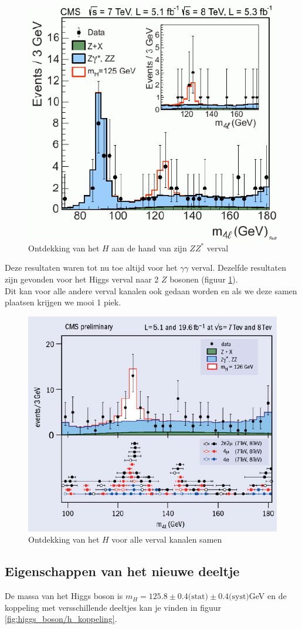 \documentclass[../main.tex]{subfiles}
\begin{document}
\begin{figure}[h]
    \centering
    \includegraphics[width=0.5\linewidth]{higgs_boson/sigma_h_z_verval.png}
    \caption{Ontdekking van het $H$ aan de hand van zijn $ZZ^*$ verval}%
    \label{fig:higgs_boson/sigma_h_z_verval}
\end{figure}

Deze resultaten waren tot nu toe altijd voor het $\gamma\gamma$ verval. Dezelfde resultaten zijn gevonden voor het Higgs verval naar 2 $Z$ bosonen (figuur \ref{fig:higgs_boson/sigma_h_z_verval}).\\
Dit kan voor alle andere verval kanalen ook gedaan worden en als we deze samen plaatsen krijgen we mooi 1 piek.

\begin{figure}[h]
    \centering
    \includegraphics[width=0.5\linewidth]{higgs_boson/sigma_h_alles.png}
    \caption{Ontdekking van het $H$ voor alle verval kanalen samen}%
    \label{fig:higgs_boson/sigma_h_alles}
\end{figure}

\subsection{Eigenschappen van het nieuwe deeltje}%
\label{sub:eigenschappen_van_het_nieuwe_deeltje}

De massa van het Higgs boson is $m_H=125.8\pm0.4\text{(stat)}\pm 0.4\text{(syst)}$GeV en de koppeling met versschillende deeltjes kan je vinden in figuur \ref{fig:higgs_boson/h_koppeling}.
\end{document}
